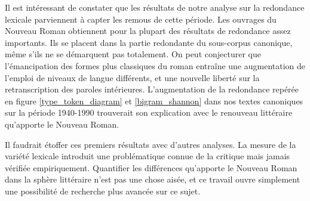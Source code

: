 \documentclass[a4paper,twoside,12pt]{book}
\begin{document}
Il est intéressant de constater que les résultats de notre analyse sur la redondance lexicale parviennent à capter les remous de cette période. Les ouvrages du Nouveau Roman obtiennent pour la plupart des résultats de redondance assez importants. Ils se placent dans la partie redondante du sous-corpus canonique, même s'ils ne se démarquent pas totalement. On peut conjecturer que l'émancipation des formes plus classiques du roman entraîne une augmentation de l'emploi de niveaux de langue différents, et une nouvelle liberté sur la retranscription des paroles intérieures. L'augmentation de la redondance repérée en figure \ref{type_token_diagram} et \ref{bigram_shannon} dans nos textes canoniques sur la période 1940-1990 trouverait son explication avec le renouveau littéraire qu'apporte le Nouveau Roman. 

Il faudrait étoffer ces premiers résultats avec d'autres analyses. La mesure de la variété lexicale introduit une problématique connue de la critique mais jamais vérifiée empiriquement. Quantifier les différences qu'apporte le Nouveau Roman dans la sphère littéraire n'est pas une chose aisée, et ce travail ouvre simplement une possibilité de recherche plus avancée sur ce sujet.

\newpage
\end{document}
